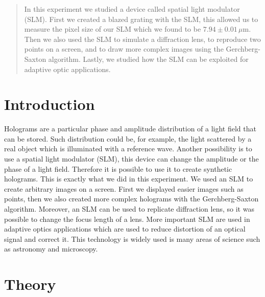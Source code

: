 \documentclass[a4paper,10pt]{article}
\begin{document}
\begin{titlepage}
\end{titlepage}
\begin{abstract}
In this experiment we studied a device called spatial light modulator (SLM). First we created a blazed grating with the SLM, this allowed us to measure the pixel size of our SLM which we found to be $7.94\pm 0.01 \, \mu \text{m}$. Then we also used the SLM to simulate a diffraction lens, to reproduce two points on a screen, and to draw more complex images using the Gerchberg-Saxton algorithm. Lastly, we studied how the SLM can be exploited for adaptive optic applications.
\end{abstract}
\section{Introduction}
Holograms are a particular phase and amplitude distribution of a light field that can be stored. Such distribution could be, for example, the light scattered by a real object which is illuminated with a reference wave. Another possibility is to use a spatial light modulator (SLM), this device can change the amplitude or the phase of a light field. Therefore it is possible to use it to create synthetic holograms. This is exactly what we did in this experiment. We used an SLM to create arbitrary images on a screen. First we displayed easier images such as points, then we also created more complex holograms with the Gerchberg-Saxton algorithm. Moreover, an SLM can be used to replicate diffraction lens, so it was possible to change the focus length of a lens. More important SLM are used in adaptive optics applications which are used to reduce distortion of an optical signal and correct it. This technology is widely used is many areas of science such as astronomy and microscopy.
\section{Theory}
\end{document}
